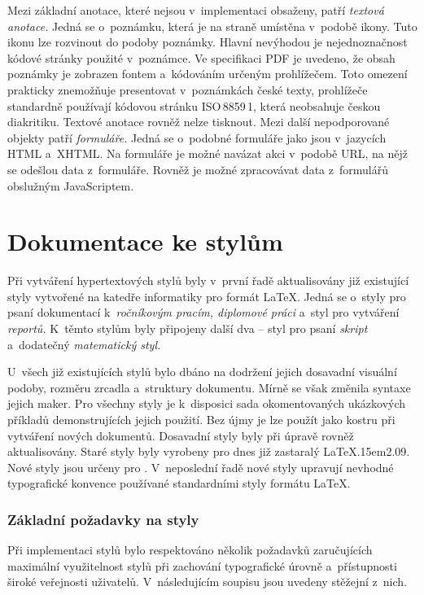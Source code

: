 \documentclass[12pt]{article}
\begin{document}
\medskip
Mezi základní anotace, které nejsou v~implementaci obsaženy, patří 
\emph{textová anotace.} Jedná se o~poznámku, která je na
straně umístěna v~podobě ikony. Tuto ikonu lze rozvinout do podoby poznámky.
Hlavní nevýhodou je nejednoznačnost kódové stránky použité v~poznámce. 
Ve specifikaci PDF je uvedeno, že obsah poznámky je zobrazen fontem 
a~kódováním určeným prohlížečem. Toto omezení prakticky znemožňuje presentovat
v~poznámkách české texty, prohlížeče standardně používají kódovou 
stránku \mbox{ISO\,8859\,1}, která neobsahuje českou diakritiku.
Textové anotace rovněž nelze tisknout.
Mezi další nepodporované objekty patří \emph{formuláře.}
Jedná se o~podobné formuláře jako jsou v~jazycích HTML a~XHTML. Na formuláře
je možné navázat akci v~podobě URL, na nějž se odešlou data z~formuláře.
Rovněž je možné zpracovávat data z~formulářů obslužným JavaScriptem.

\section{Dokumentace ke stylům}\label{dokumentace}
Při vytváření hypertextových stylů byly v~první řadě aktualisovány již
existující styly vytvořené na katedře informatiky
pro formát \LaTeX. Jedná se o~styly pro psaní dokumentací 
k~\emph{ročníkovým pracím, diplomové práci} 
a~styl pro vytváření \emph{reportů.} K~těmto stylům byly připojeny další 
dva -- styl pro psaní \emph{skript} a~dodatečný \emph{matematický styl.} 

\medskip
U~všech již existujících stylů bylo dbáno na dodržení jejich dosavadní
visuální podoby, rozměru zrcadla a~struktury dokumentu. 
Mírně se však změnila syntaxe jejich maker. 
Pro všechny styly je k~disposici sada okomentovaných ukázkových příkladů
demonstrujících jejich použití. Bez újmy je lze použít jako kostru 
při vytváření nových dokumentů. Dosavadní styly byly při úpravě rovněž
aktualisovány. Staré styly byly vyrobeny pro dnes již zastaralý
\mbox{\LaTeX\kern.15em2.09.} Nové styly jsou určeny pro \LaTeXE.
V~neposlední řadě nové styly upravují nevhodné typografické konvence
používané standardními styly formátu \LaTeX.

\subsubsection*{Základní požadavky na styly}
Při implementaci stylů bylo respektováno několik požadavků zaručujících
maxi\-mál\-ní
využitelnost stylů při zachování typografické úrovně a~přístupnosti
široké veřejnosti uživatelů. V~následujícím soupisu jsou uvedeny 
stěžejní z~nich.
\end{document}
